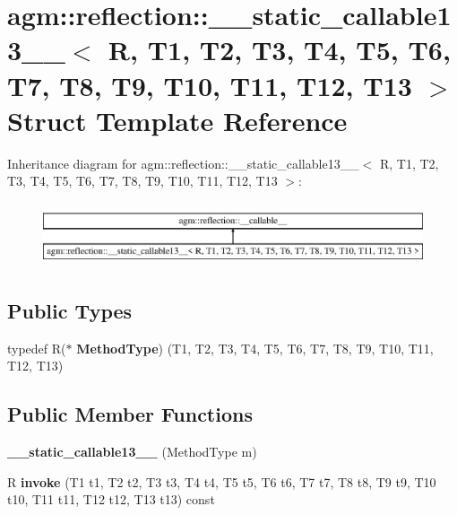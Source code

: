 \hypertarget{structagm_1_1reflection_1_1____static__callable13____}{}\section{agm\+:\+:reflection\+:\+:\+\_\+\+\_\+static\+\_\+callable13\+\_\+\+\_\+$<$ R, T1, T2, T3, T4, T5, T6, T7, T8, T9, T10, T11, T12, T13 $>$ Struct Template Reference}
\label{structagm_1_1reflection_1_1____static__callable13____}
Inheritance diagram for agm\+:\+:reflection\+:\+:\+\_\+\+\_\+static\+\_\+callable13\+\_\+\+\_\+$<$ R, T1, T2, T3, T4, T5, T6, T7, T8, T9, T10, T11, T12, T13 $>$\+:\begin{figure}[H]
\begin{center}
\leavevmode
\includegraphics[height=1.901528cm]{structagm_1_1reflection_1_1____static__callable13____}
\end{center}
\end{figure}
\subsection*{Public Types}
\begin{DoxyCompactItemize}
\item 
typedef R($\ast$ {\bfseries Method\+Type}) (T1, T2, T3, T4, T5, T6, T7, T8, T9, T10, T11, T12, T13)\hypertarget{structagm_1_1reflection_1_1____static__callable13_____a2601a71701ebd51d0221850104dd4e38}{}\label{structagm_1_1reflection_1_1____static__callable13_____a2601a71701ebd51d0221850104dd4e38}

\end{DoxyCompactItemize}
\subsection*{Public Member Functions}
\begin{DoxyCompactItemize}
\item 
{\bfseries \+\_\+\+\_\+static\+\_\+callable13\+\_\+\+\_\+} (Method\+Type m)\hypertarget{structagm_1_1reflection_1_1____static__callable13_____a01d81233bcf72240c152d304996afac3}{}\label{structagm_1_1reflection_1_1____static__callable13_____a01d81233bcf72240c152d304996afac3}

\item 
R {\bfseries invoke} (T1 t1, T2 t2, T3 t3, T4 t4, T5 t5, T6 t6, T7 t7, T8 t8, T9 t9, T10 t10, T11 t11, T12 t12, T13 t13) const \hypertarget{structagm_1_1reflection_1_1____static__callable13_____aa530d209b69899a4159e2216d3eff5c3}{}\label{structagm_1_1reflection_1_1____static__callable13_____aa530d209b69899a4159e2216d3eff5c3}

\end{DoxyCompactItemize}
